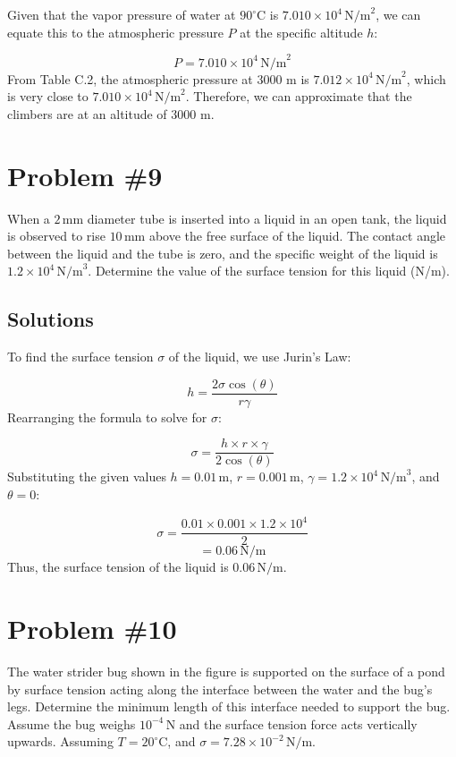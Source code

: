 \documentclass{article}
\begin{document}
Given that the vapor pressure of water at \(90^\circ \text{C}\) is \(7.010 \times 10^4 \, \text{N/m}^2\), we can equate this to the atmospheric pressure \(P\) at the specific altitude \(h\):

\[
P = 7.010 \times 10^4 \, \text{N/m}^2
\]
From Table C.2, the atmospheric pressure at 3000 m is \(7.012 \times 10^4 \, \text{N/m}^2\), which is very close to \(7.010 \times 10^4 \, \text{N/m}^2\). Therefore, we can approximate that the climbers are at an altitude of 3000 m.
\newpage
\section*{Problem \#9}

When a \(2 \, \text{mm}\) diameter tube is inserted into a liquid in an open tank, the liquid is observed to rise \(10 \, \text{mm}\) above the free surface of the liquid. The contact angle between the liquid and the tube is zero, and the specific weight of the liquid is \(1.2 \times 10^4 \, \text{N/m}^3\). Determine the value of the surface tension for this liquid (N/m).

\subsection*{Solutions}
To find the surface tension \( \sigma \) of the liquid, we use Jurin's Law:

\[
h = \frac{{2 \sigma \cos(\theta)}}{{r \gamma}}
\]
Rearranging the formula to solve for \( \sigma \):

\[
\sigma = \frac{{h \times r \times \gamma}}{2 \cos(\theta)}
\]
Substituting the given values \( h = 0.01 \, \text{m} \), \( r = 0.001 \, \text{m} \), \( \gamma = 1.2 \times 10^4 \, \text{N/m}^3 \), and \( \theta = 0 \):

\[
\sigma = \frac{{0.01 \times 0.001 \times 1.2 \times 10^4}}{2}
\]
\[
= 0.06 \, \text{N/m}
\]
Thus, the surface tension of the liquid is \(0.06 \, \text{N/m}\).
\newpage
\section*{Problem \#10}
The water strider bug shown in the figure is supported on the surface of a pond by surface tension acting along the interface between the water and the bug's legs. Determine the minimum length of this interface needed to support the bug. Assume the bug weighs \(10^{-4} \, \text{N}\) and the surface tension force acts vertically upwards. Assuming \(T = 20^\circ \text{C}\), and \(\sigma = 7.28 \times 10^{-2} \, \text{N/m}\).
\end{document}
